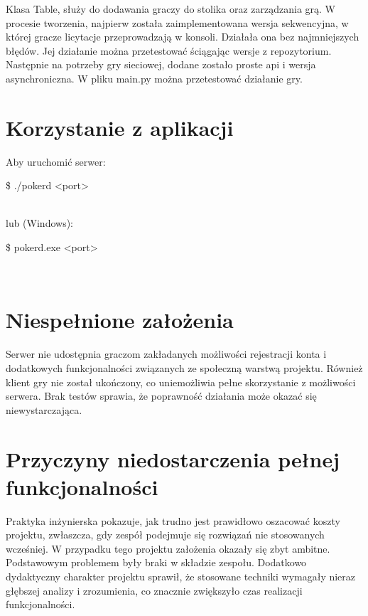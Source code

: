 \documentclass[12pt,a4paper]{article}
\begin{document}
Klasa Table, służy do dodawania graczy do stolika oraz zarządzania grą.
W procesie tworzenia, najpierw została zaimplementowana wersja sekwencyjna, w której
gracze licytacje przeprowadzają w konsoli. Działała ona bez najmniejszych błędów. Jej
działanie można przetestować ściągając wersje z repozytorium.
Następnie na potrzeby gry sieciowej, dodane zostało proste api i wersja asynchroniczna. W
pliku main.py można przetestować działanie gry.

\section{Korzystanie z aplikacji}
Aby uruchomić serwer:\\
\begin{code}
\$ ./pokerd <port>
\end{code}\\
lub (Windows):\\
\begin{code}
\$ pokerd.exe <port>
\end{code}\\

\section{Niespełnione założenia}
Serwer nie udostępnia graczom zakładanych możliwości rejestracji konta i dodatkowych
funkcjonalności związanych ze społeczną warstwą projektu. Również klient gry nie został ukończony, co uniemożliwia pełne skorzystanie z możliwości serwera.
Brak testów sprawia, że poprawność działania może okazać się niewystarczająca.

\section{Przyczyny niedostarczenia pełnej funkcjonalności}
Praktyka inżynierska pokazuje, jak trudno jest prawidłowo oszacować koszty projektu, zwłaszcza, gdy zespół podejmuje się rozwiązań nie stosowanych wcześniej. W przypadku tego projektu założenia okazały się zbyt ambitne. Podstawowym problemem były
braki w składzie zespołu. Dodatkowo dydaktyczny charakter projektu sprawił,
że stosowane techniki wymagały nieraz głębszej analizy i zrozumienia, co
znacznie zwiększyło czas realizacji funkcjonalności.
\end{document}
